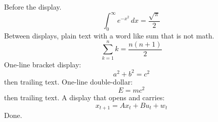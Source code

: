 Before the display.
$$
\int_0^\infty e^{-x^2}\,dx = \frac{\sqrt{\pi}}{2}
$$
Between displays, plain text with a word like sum that is not math.
\[
\sum_{k=1}^{n} k = \frac{n(n+1)}{2}
\]
One-line bracket display: \[ a^2 + b^2 = c^2 \] then trailing text.
One-line double-dollar: $$ E = mc^2 $$ then trailing text.
A display that opens and carries:
\[
  x_{t+1} = A x_t + B u_t
  + w_t
\]
Done.
